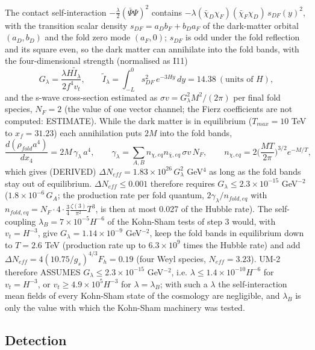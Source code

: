 \documentclass[
  10pt,
]{article}
\begin{document}
The contact self-interaction \(-\frac{\lambda}{2}(\bar\Psi\Psi)^2\)
contains \(-\lambda(\bar\chi_D\chi_F)(\bar\chi_F\chi_D)\,s_{DF}(y)^2\),
with the transition scalar density \(s_{DF} = a_Db_F + b_Da_F\) of the
dark-matter orbital \((a_D, b_D)\) and the fold zero mode \((a_F, 0)\);
\(s_{DF}\) is odd under the fold reflection and its square even, so the
dark matter can annihilate into the fold bands, with the
four-dimensional strength (normalised as I11)
\[ G_\lambda = \frac{\lambda H\tilde I_\lambda}{2f^4v_t},\qquad \tilde I_\lambda = \int_{-L}^{0}s_{DF}^2\,e^{-3Hy}\,dy = 14.38\ (\text{units of }H), \]
and the s-wave cross-section estimated as
\(\sigma v = G_\lambda^2M^2/(2\pi)\) per final fold species, \(N_F = 2\)
(the value of one vector channel; the Fierz coefficients are not
computed: ESTIMATE). While the dark matter is in equilibrium
(\(T_{max} = 10\) TeV to \(x_f = 31.23\)) each annihilation puts \(2M\)
into the fold bands,
\[ \frac{d(\rho_{fold}a^4)}{dx_4} = 2M\,\gamma_\lambda\,a^4,\qquad \gamma_\lambda = \sum_{A,B}n_{\chi,eq}n_{\bar\chi,eq}\,\sigma v\,N_F,\qquad n_{\chi,eq} = 2\Big(\frac{MT}{2\pi}\Big)^{3/2}e^{-M/T}, \]
which gives (DERIVED)
\(\Delta N_{eff} = 1.83\times10^{26}\,G_\lambda^2\) GeV\(^4\) as long as
the fold bands stay out of equilibrium. \(\Delta N_{eff} \le 0.001\)
therefore requires \(G_\lambda \le 2.3\times10^{-15}\) GeV\(^{-2}\)
(\(1.8\times10^{-6}\,G_A\); the production rate per fold quantum,
\(2\gamma_\lambda/n_{fold,eq}\) with
\(n_{fold,eq} = N_F\cdot4\cdot\frac34\frac{\zeta(3)}{\pi^2}T^3\), is
then at most 0.027 of the Hubble rate). The self-coupling
\(\lambda_B = 7\times10^{-5}H^{-6}\) of the Kohn-Sham tests of step 3
would, with \(v_t = H^{-3}\), give \(G_\lambda = 1.14\times10^{-9}\)
GeV\(^{-2}\), keep the fold bands in equilibrium down to \(T = 2.6\) TeV
(production rate up to \(6.3\times10^9\) times the Hubble rate) and add
\(\Delta N_{eff} = 4(10.75/g_s)^{4/3}F_h = 0.19\) (four Weyl species,
\(N_{eff} = 3.23\)). UM-2 therefore ASSUMES
\(G_\lambda \le 2.3\times10^{-15}\) GeV\(^{-2}\), i.e.
\(\lambda \le 1.4\times10^{-10}H^{-6}\) for \(v_t = H^{-3}\), or
\(v_t \ge 4.9\times10^5H^{-3}\) for \(\lambda = \lambda_B\); with such a
\(\lambda\) the self-interaction mean fields of every Kohn-Sham state of
the cosmology are negligible, and \(\lambda_B\) is only the value with
which the Kohn-Sham machinery was tested.

\hypertarget{detection}{%
\subsection{Detection}\label{detection}}
\end{document}
